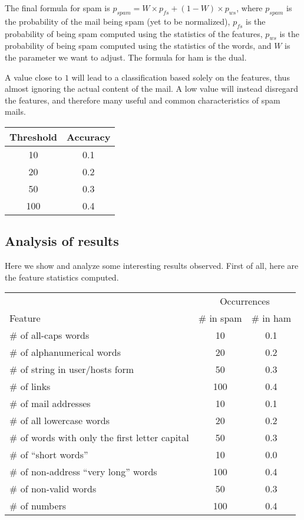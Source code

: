 The final formula for spam is $p_{spam} = W \times p_{fs} + (1-W) \times p_{ws}$, where $p_{spam}$ is the probability of the mail being spam (yet to be normalized), $p_{fs}$ is the probability of being spam computed using the statistics of the features, $p_{ws}$ is the probability of being spam computed using the statistics of the words, and $W$ is the parameter we want to adjust. The formula for ham is the dual.

A value close to $1$ will lead to a classification based solely on the features, thus almost ignoring the actual content of the mail. A low value will instead disregard the features, and therefore many useful and common characteristics of spam mails.

\begin{center}
\begin{tabular}{cc}
\toprule
Threshold & Accuracy \\
\midrule
10    & 0.1 \\
20    & 0.2 \\
50    & 0.3 \\
100   & 0.4 \\
\bottomrule
\end{tabular}
\end{center}

\subsection{Analysis of results}
Here we show and analyze some interesting results observed. First of all, here are the feature statistics computed.

\begin{center}
\begin{tabular}{lcc}
\toprule
& \multicolumn{2}{c}{Occurrences} \\
\cmidrule(r){2-3}
Feature & \# in spam & \# in ham \\
\midrule
\# of all-caps words                            & 10    & 0.1 \\
\# of alphanumerical words                      & 20    & 0.2 \\
\# of string in user/hosts form                 & 50    & 0.3 \\
\# of links                                     & 100   & 0.4 \\
\# of mail addresses                            & 10    & 0.1 \\
\# of all lowercase words                       & 20    & 0.2 \\
\# of words with only the first letter capital  & 50    & 0.3 \\
\# of ``short words''                           & 10    & 0.0 \\
\# of non-address ``very long'' words           & 100   & 0.4 \\
\# of non-valid words                           & 50    & 0.3 \\
\# of numbers                                   & 100   & 0.4 \\
\bottomrule
\end{tabular}
\end{center}

